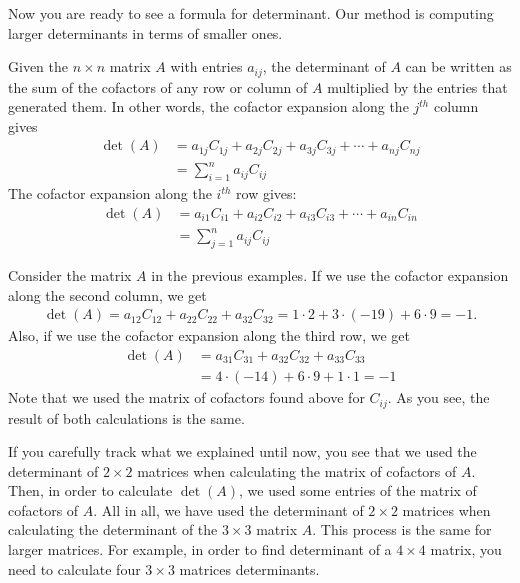 \documentclass{subfile}
\begin{document}
Now you are ready to see a formula for determinant. Our method is computing larger determinants in terms of smaller ones.

	\begin{definition}
		Given the $n\times n$ matrix $A$ with entries $a_{ij}$, the determinant of $A$ can be written as the sum of the cofactors of any row or column of $A$ multiplied by the entries that generated them. In other words, the cofactor expansion along the $j^{th}$ column gives
		\begin{align*}
			\det(A)
				& = a_{1j}C_{1j} + a_{2j}C_{2j} + a_{3j}C_{3j} + \cdots + a_{nj}C_{nj}\\
				& = \sum_{i=1}^{n} a_{ij} C_{ij}
		\end{align*}
		The cofactor expansion along the $i^{th}$ row gives:
		\begin{align*}
			\det(A)
				& = a_{i1}C_{i1} + a_{i2}C_{i2} + a_{i3}C_{i3} + \cdots + a_{in}C_{in}\\
				& = \sum_{j=1}^{n} a_{ij} C_{ij}
		\end{align*}
	\end{definition}

	\begin{example}
		Consider the matrix $A$ in the previous examples. If we use the cofactor expansion along the second column, we get
		\begin{align*}
			\det(A)=a_{12} C_{12} + a_{22}C_{22} + a_{32} C_{32} = 1 \cdot 2 + 3 \cdot (-19) + 6 \cdot 9 = -1.
		\end{align*}
		Also, if we use the cofactor expansion along the third row, we get
		\begin{align*}
			\det(A)
				& =a_{31} C_{31} + a_{32}C_{32} + a_{33} C_{33}\\
				& = 4 \cdot (-14) + 6 \cdot 9 + 1 \cdot 1 = -1
		\end{align*}
		Note that we used the matrix of cofactors found above for $C_{ij}$. As you see, the result of both calculations is the same.
	\end{example}

If you carefully track what we explained until now, you see that we used the determinant of $2\times 2$ matrices when calculating the matrix of cofactors of $A$. Then, in order to calculate $\det(A)$, we used some entries of the matrix of cofactors of $A$. All in all, we have used the determinant of $2\times 2$ matrices when calculating the determinant of the $3 \times 3$ matrix $A$. This process is the same for larger matrices. For example, in order to find determinant of a $4 \times 4$ matrix, you need to calculate four $3\times 3$ matrices determinants.
\end{document}
